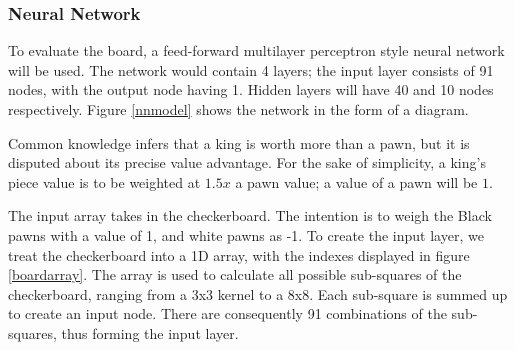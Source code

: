 \documentclass[12pt,a4paper]{article}
\begin{document}
\begin{figure}[ht!]
    \end{figure}
 

\subsubsection{Neural Network}

    To evaluate the board, a feed-forward multilayer perceptron style neural network will be used. The network would contain 4 layers; the input layer consists of 91 nodes, with the output node having 1. Hidden layers will have 40 and 10 nodes respectively. Figure \ref{nnmodel} shows the network in the form of a diagram.

    Common knowledge infers that a king is worth more than a pawn, but it is disputed about its precise value advantage. For the sake of simplicity, a king's piece value is to be weighted at $1.5x$ a pawn value; a value of a pawn will be $1$. 

    The input array takes in the checkerboard. The intention is to weigh the Black pawns with a value of 1, and white pawns as -1. To create the input layer, we treat the checkerboard into a 1D array, with the indexes displayed in figure \ref{boardarray}. The array is used to calculate all possible sub-squares of the checkerboard, ranging from a 3x3 kernel to a 8x8. Each sub-square is summed up to create an input node. There are consequently 91 combinations of the sub-squares, thus forming the input layer. 
\end{document}
